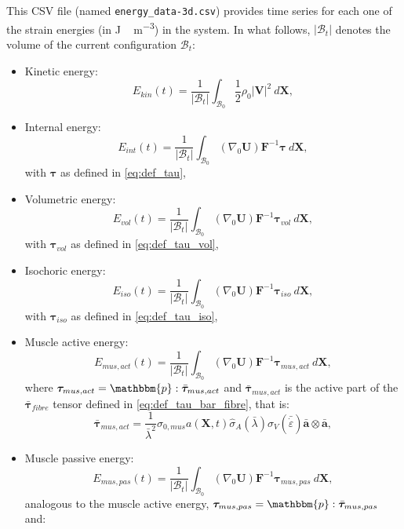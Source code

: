 \documentclass{sfuthesis}
\numberwithin{equation}{section}
\numberwithin{figure}{chapter}
\numberwithin{table}{chapter}
\theoremstyle{definition}
\def\*#1{{\mathbf{#1}}} %
\newcommand{\depsilon}{\dot{\varepsilon}}
\newcommand{\B}{\mathcal{B}}
\newcommand{\p}{\mathbbm{p}}
\def\btau{{\bm{\tau}}}
\begin{document}
This CSV file (named \texttt{energy\_data-3d.csv}) provides time series for each one of the strain energies (in \unit{J \, m^{-3}}) in the system. In what follows, $|\B_t|$ denotes the volume of the current configuration $\B_t$:
\begin{itemize}
    \item Kinetic energy:
    \begin{equation}
        E_{kin}(t) = \dfrac{1}{|\B_t|} \int_{\B_0} \dfrac{1}{2} \rho_0 |\*V|^2 \ d\*X,
    \end{equation}
    \item Internal energy:
    \begin{equation}
        E_{int}(t) = \dfrac{1}{|\B_t|} \int_{\B_0} (\nabla_0 \*U) \*F^{-1} \btau \ d\*X,
    \end{equation}
    with $\btau$ as defined in \eqref{eq:def_tau},
    \item Volumetric energy:
    \begin{equation}
        E_{vol}(t) = \dfrac{1}{|\B_t|} \int_{\B_0} (\nabla_0 \*U) \*F^{-1} \btau_{vol} \ d\*X,
    \end{equation}
    with $\btau_{vol}$ as defined in \eqref{eq:def_tau_vol},
    \item Isochoric energy:
    \begin{equation}
        E_{iso}(t) = \dfrac{1}{|\B_t|} \int_{\B_0} (\nabla_0 \*U) \*F^{-1} \btau_{iso} \ d\*X,
    \end{equation}
    with $\btau_{iso}$ as defined in \eqref{eq:def_tau_iso},
    \item Muscle active energy:
    \begin{equation}
        E_{mus,act}(t) = \dfrac{1}{|\B_t|} \int_{\B_0} (\nabla_0 \*U) \*F^{-1} \btau_{mus,act} \ d\*X,
    \end{equation}
    where $\btau_{mus,act} = \p : \bar{\btau}_{mus,act}$ and $\bar{\btau}_{mus,act}$ is the active part of the $\bar{\btau}_{fibre}$ tensor defined in \eqref{eq:def_tau_bar_fibre}, that is:
    \[
        \bar{\btau}_{mus,act} = \dfrac{1}{\bar{\lambda}^2} \sigma_{0,mus}  a(\*X,t) \widehat{\sigma}_A(\bar{\lambda}) \widehat{\sigma}_V(\bar{\depsilon})  \bar{\*a} \otimes \bar{\*a},
    \]
    \item Muscle passive energy:
    \begin{equation}
        E_{mus,pas}(t) = \dfrac{1}{|\B_t|} \int_{\B_0} (\nabla_0 \*U) \*F^{-1} \btau_{mus,pas} \ d\*X,
    \end{equation}
    analogous to the muscle active energy,  $\btau_{mus,pas} = \p : \bar{\btau}_{mus,pas}$ and:

\end{itemize}
\end{document}
